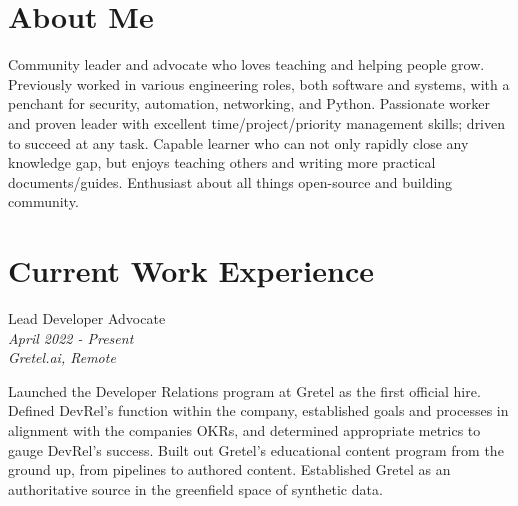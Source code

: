 \documentclass[10pt]{article} %
\begin{document}
\begin{minipage}[t]{0.5\textwidth} %
\vspace{0pt} %
    
\section{About Me}
Community leader and advocate who loves teaching and helping people grow. Previously worked in various engineering roles, both software and systems, with a penchant for security, automation, networking, and Python. Passionate worker and proven leader with excellent time/project/priority management skills; driven to succeed at any task. Capable learner who can not only rapidly close any knowledge gap, but enjoys teaching others and writing more practical documents/guides. Enthusiast about all things open-source and building community.


\section{Current Work Experience} 


{\raggedright\large Lead Developer Advocate\\
\small \textit{April 2022 - Present}\\
\small \textit{Gretel.ai, Remote} \\}

\normalsize{
    Launched the Developer Relations program at Gretel as the first official hire. Defined DevRel's function within the company, established goals and  processes in alignment with the companies OKRs, and determined appropriate metrics to gauge DevRel's success. Built out Gretel's educational content program from the ground up, from pipelines to authored content. Established Gretel as an authoritative source in the greenfield space of synthetic data. \\

}
\end{minipage}
\end{document}
